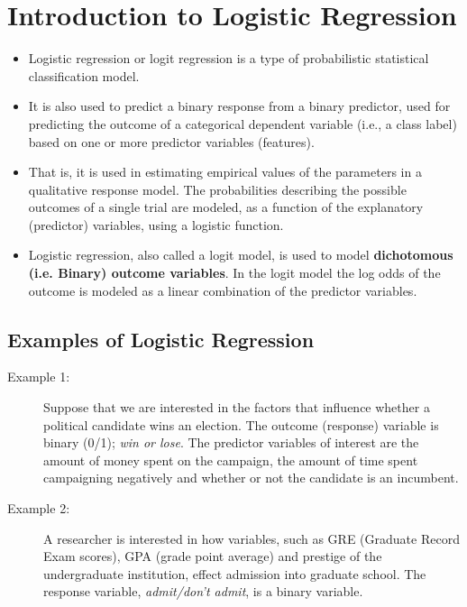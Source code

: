 \documentclass[12pt, a4paper]{article}
\theoremstyle{plain}
\theoremstyle{definition}
\theoremstyle{remark}
\begin{document}
\section{Introduction to Logistic Regression}
\begin{itemize}
	\item Logistic regression or logit regression is a type of probabilistic statistical classification model.
	
	\item It is also used to predict a binary response from a binary predictor, used for predicting the outcome of a categorical dependent variable (i.e., a class label) based on one or more predictor variables (features). 
	
	\item That is, it is used in estimating empirical values of the parameters in a qualitative response model. The probabilities describing the possible outcomes of a single trial are modeled, as a function of the explanatory (predictor) variables, using a logistic function. 
	
	\item Logistic regression, also called a logit model, is used to model \textbf{dichotomous (i.e. Binary) outcome variables}. In the logit model the log odds of the outcome is modeled as a linear combination of the predictor variables.
\end{itemize}


\subsection{Examples of Logistic Regression}

\begin{description}
	\item[Example 1:]  Suppose that we are interested in the factors that influence whether a political candidate wins an election.  The outcome (response) variable is binary (0/1); \textit{ win or lose}.  The predictor variables of interest are the amount of money spent on the campaign, the amount of time spent campaigning negatively and whether or not the candidate is an incumbent.
	
	\item[Example 2:]  A researcher is interested in how variables, such as GRE (Graduate Record Exam scores), GPA (grade point average) and prestige of the undergraduate institution, effect admission into graduate school. The response variable, \textit{admit/don't admit}, is a binary variable.
\end{description}
\end{document}

